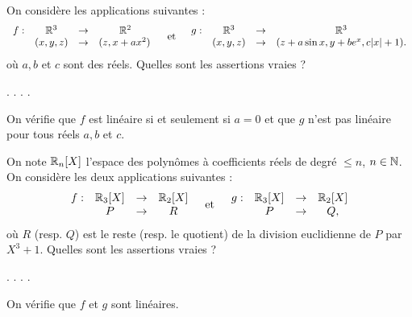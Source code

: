 \begin{question}
On considère les applications suivantes : 
$$\begin{array}{rccc}f:&\mathbb{R}^3&\to&\mathbb{R}^2\\
& (x,y,z)&\to &(z,x+ax^2) \,  \end{array}  \quad \mbox{et} \quad  \begin{array}{rccc}g:&\mathbb{R}^3&\to&\mathbb{R}^3\\
& (x,y,z)&\to &(z+a\sin x, y+be^x, c|x|+1).\end{array} $$ 
où $a,b$ et $c$ sont des réels. Quelles sont les assertions vraies ?
\begin{answers}  
.
.
.
.
\end{answers}
\begin{explanations} On vérifie que $f$ est linéaire si et seulement si $a=0$ et que $g$ n'est pas linéaire pour 
tous réels $a,b$ et $c$.
\end{explanations}
\end{question}

\begin{question}
On note $\mathbb{R}_n[X]$ l'espace des polynômes à coefficients réels de degré $\le n$,  $n\in \mathbb{N}$. On considère les deux applications suivantes : 
$$\begin{array}{rccc}f:&\mathbb{R}_3[X]&\to&\mathbb{R}_2[X]\\
& P&\to &R \end{array} \quad \mbox{et} \quad 
 \begin{array}{rccc}g:&\mathbb{R}_3[X]&\to& \mathbb{R}_2[X]\\
& P&\to &Q,\end{array}$$
où $R$ (resp. $Q$) est le reste (resp. le quotient) de la division euclidienne de $P$ par $X^3+1$. Quelles sont les assertions vraies ?
\begin{answers} 
.
.
.
.
\end{answers}
\begin{explanations} On vérifie que $f$ et $g$ sont linéaires.
\end{explanations}
\end{question}

